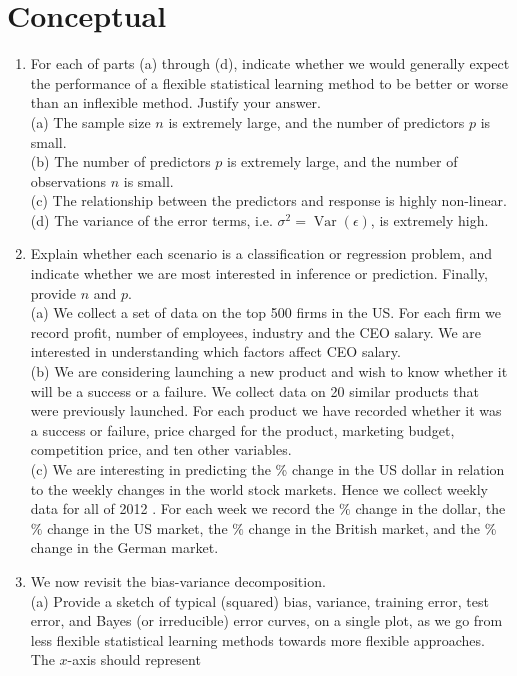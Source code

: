\documentclass[10pt]{article}
\begin{document}
\section*{Conceptual}
\begin{enumerate}
  \item For each of parts (a) through (d), indicate whether we would generally expect the performance of a flexible statistical learning method to be better or worse than an inflexible method. Justify your answer.\\
(a) The sample size $n$ is extremely large, and the number of predictors $p$ is small.\\
(b) The number of predictors $p$ is extremely large, and the number of observations $n$ is small.\\
(c) The relationship between the predictors and response is highly non-linear.\\
(d) The variance of the error terms, i.e. $\sigma^{2}=\operatorname{Var}(\epsilon)$, is extremely high.
  \item Explain whether each scenario is a classification or regression problem, and indicate whether we are most interested in inference or prediction. Finally, provide $n$ and $p$.\\
(a) We collect a set of data on the top 500 firms in the US. For each firm we record profit, number of employees, industry and the CEO salary. We are interested in understanding which factors affect CEO salary.\\
(b) We are considering launching a new product and wish to know whether it will be a success or a failure. We collect data on 20 similar products that were previously launched. For each product we have recorded whether it was a success or failure, price charged for the product, marketing budget, competition price, and ten other variables.\\
(c) We are interesting in predicting the \% change in the US dollar in relation to the weekly changes in the world stock markets. Hence we collect weekly data for all of 2012 . For each week we record the $\%$ change in the dollar, the $\%$ change in the US market, the $\%$ change in the British market, and the \% change in the German market.
  \item We now revisit the bias-variance decomposition.\\
(a) Provide a sketch of typical (squared) bias, variance, training error, test error, and Bayes (or irreducible) error curves, on a single plot, as we go from less flexible statistical learning methods towards more flexible approaches. The $x$-axis should represent\

\end{enumerate}
\end{document}
